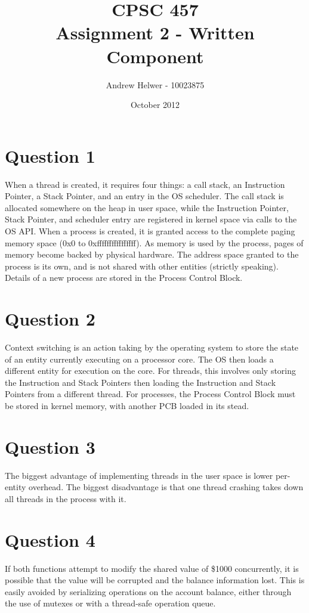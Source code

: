 \documentclass[letterpaper]{article}
\begin{document}
\title{CPSC 457 \\ Assignment 2 - Written Component}
\author{Andrew Helwer - 10023875}
\date{October 2012}
\maketitle

\section{Question 1}

When a thread is created, it requires four things: a call stack, an Instruction Pointer, a Stack Pointer, and an entry in the OS scheduler.
The call stack is allocated somewhere on the heap in user space, while the Instruction Pointer, Stack Pointer, and scheduler entry are registered in kernel space via calls to the OS API.
When a process is created, it is granted access to the complete paging memory space (0x0 to 0xffffffffffffffff).
As memory is used by the process, pages of memory become backed by physical hardware.
The address space granted to the process is its own, and is not shared with other entities (strictly speaking).
Details of a new process are stored in the Process Control Block.

\section{Question 2}

Context switching is an action taking by the operating system to store the state of an entity currently executing on a processor core.
The OS then loads a different entity for execution on the core.
For threads, this involves only storing the Instruction and Stack Pointers then loading the Instruction and Stack Pointers from a different thread.
For processes, the Process Control Block must be stored in kernel memory, with another PCB loaded in its stead.

\section{Question 3}

The biggest advantage of implementing threads in the user space is lower per-entity overhead.
The biggest disadvantage is that one thread crashing takes down all threads in the process with it.

\section{Question 4}

If both functions attempt to modify the shared value of \$1000 concurrently, it is possible that the value will be corrupted and the balance information lost.
This is easily avoided by serializing operations on the account balance, either through the use of mutexes or with a thread-safe operation queue.
\end{document}
